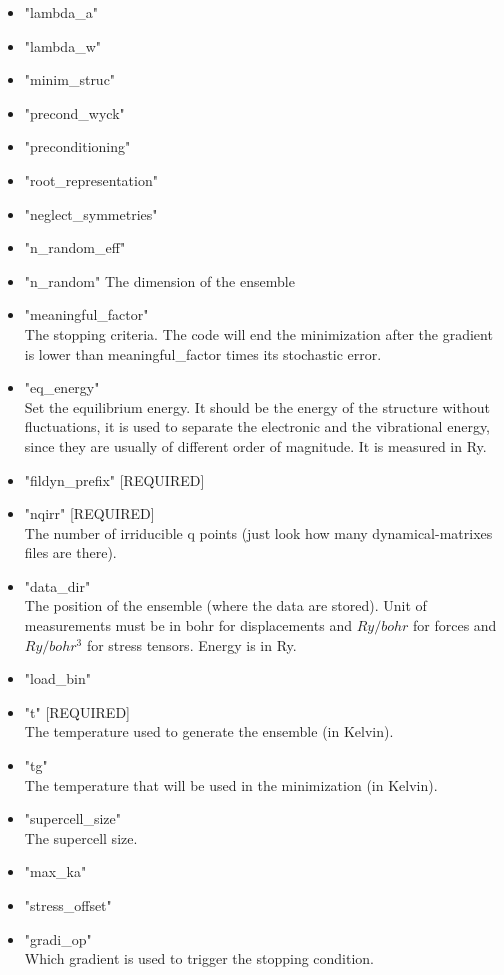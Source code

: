 \documentclass[]{scrartcl}
\begin{document}
\begin{itemize}
	\item "lambda\_a"
	\item "lambda\_w"
	\item "minim\_struc"
	\item "precond\_wyck"
	\item "preconditioning"
	\item "root\_representation"
	\item "neglect\_symmetries"
	\item "n\_random\_eff"
	\item "n\_random"
	The dimension of the ensemble
	\item "meaningful\_factor"\\
	The stopping criteria. The code will end the minimization after the gradient is lower than meaningful\_factor times its stochastic error.
	\item "eq\_energy"\\
	Set the equilibrium energy.
	It should be the energy of the structure without fluctuations,
	it is used to separate the electronic and the vibrational energy,
	since they are usually of different order of magnitude.
	It is measured in Ry.
	\item "fildyn\_prefix" [REQUIRED]
	\item "nqirr" [REQUIRED]\\
	The number of irriducible q points (just look how many dynamical-matrixes files are there).
	\item "data\_dir"\\
	The position of the ensemble (where the data are stored). Unit of measurements must be in bohr for displacements and $Ry/bohr$ for forces and $Ry/bohr^3$ for stress tensors. Energy is in Ry.
	\item "load\_bin"
	\item "t" [REQUIRED]\\
	The temperature used to generate the ensemble (in Kelvin).
	\item "tg"\\
	The temperature that will be used in the minimization (in Kelvin).
	\item "supercell\_size"\\
	The supercell size.
	\item "max\_ka"
	\item "stress\_offset"
	\item "gradi\_op"\\
	Which gradient is used to trigger the stopping condition.

\end{itemize}
\end{document}
